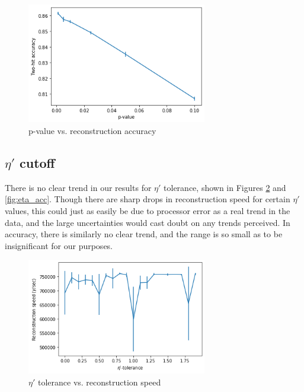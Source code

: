 \begin{figure}
    \centering
    \includegraphics[width=0.7\textwidth]{graphs/pi_p_acc.png}
    \caption{p-value vs. reconstruction accuracy}
    \label{fig:p_acc}
\end{figure}

\subsection{$\eta'$ cutoff}
There is no clear trend in our results for $\eta'$ tolerance, shown in Figures \ref{fig:eta_speed} and \ref{fig:eta_acc}. Though there are sharp drops in reconstruction speed for certain $\eta'$ values, this could just as easily be due to processor error as a real trend in the data, and the large uncertainties would cast doubt on any trends perceived. In accuracy, there is similarly no clear trend, and the range is so small as to be insignificant for our purposes.

\begin{figure}
    \centering
    \includegraphics[width=0.7\textwidth]{graphs/pi_eta_speed.png}
    \caption{$\eta'$ tolerance vs. reconstruction speed}
    \label{fig:eta_speed}
\end{figure}

